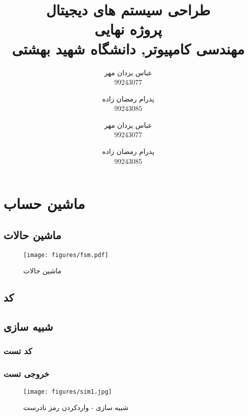 \documentclass[a4paper]{article}
\author{
عباس یزدان مهر
\\
99243077\\
\and
پدرام رمضان زاده\\
99243085
	}
\newcommand{\mycodeinput}[1]{\noindent }
\newcommand{\fulltitle}[2]{\title{#1 \\ #2}}
\newcommand{\myinf}{
	\author{
عباس یزدان مهر
\\
99243077\\
\and
پدرام رمضان زاده\\
99243085
	}
}
\begin{document}
\fulltitle{
طراحی سیستم های دیجیتال
}{
پروژه نهایی \\
مهندسی کامپیوتر, دانشگاه شهید بهشتی
}

\myinf

\maketitle

\newpage

\section{ماشین حساب}

\subsection{ماشین حالات}
\begin{figure}[H]
	\begin{small}
		\begin{center}
			\texttt{[image: figures/fsm.pdf]}
		\end{center}
		\caption{ماشین حالات}
		\label{fig:fsm}
	\end{small}
\end{figure}


\subsection{کد}
\begin{latin}
    \mycodeinput{code/calcul.vhd}
\end{latin}

\subsection{شبیه سازی}
\subsubsection{کد تست}

\begin{latin}
  \mycodeinput{code/calcultb.vhd}
\end{latin}

\subsubsection{خروجی تست}
\begin{figure}[H]
	\begin{small}
		\begin{center}
			\texttt{[image: figures/sim1.jpg]}
		\end{center}
		\caption{شبیه سازی - واردکردن رمز نادرست}
		\label{fig:sim1}
	\end{small}
\end{figure}
\end{document}
